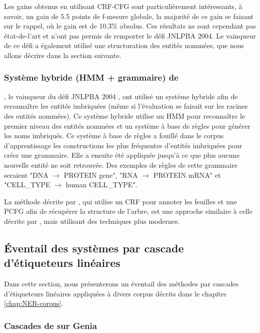 \documentclass[12pt,a4paper,times,twoside,openright]{report}
\begin{document}
Les gains obtenus en utilisant CRF-CFG sont particulièrement intéressants, à savoir, un gain de 5.5 points de f-mesure globale, la majorité de ce gain se faisant sur le rappel, où le gain est de 10.3\% absolus. Ces résultats ne sont cependant pas état-de-l'art et n'ont pas permis de remporter le défi JNLPBA 2004. Le vainqueur de ce défi a également utilisé une structuration des entités nommées, que nous allons décrire dans la section suivante.

            \subsubsection{Système hybride (HMM + grammaire) de \citet{guodong2004exploring}}

\citet{guodong2004exploring}, le vainqueur du défi JNLPBA 2004 \citep{kim2004introduction}, ont utilisé un système hybride afin de reconnaître les entités imbriquées (même si l'évaluation se faisait sur les racines des entités nommées). Ce système hybride utilise un HMM pour reconnaître le premier niveau des entités nommées et un système à base de règles pour générer les noms imbriqués. Ce système à base de règles a fouillé dans le corpus d'apprentissage les constructions les plus fréquentes d'entités imbriquées pour créer une grammaire. Elle a ensuite été appliquée jusqu'à ce que plus aucune nouvelle entité ne soit retrouvée. Des exemples de règles de cette grammaire seraient "DNA $\rightarrow$ PROTEIN gene", "RNA $\rightarrow$ PROTEIN mRNA" et "CELL\_TYPE $\rightarrow$ human CELL\_TYPE".

La méthode décrite par \citet{dinarelli2012}, qui utilise un CRF pour annoter les feuilles et une PCFG afin de récupérer la structure de l'arbre, est une approche similaire à celle décrite par \citet{guodong2004exploring}, mais utilisant des techniques plus modernes.


        \subsection{Éventail des systèmes par cascade d'étiqueteurs linéaires}

Dans cette section, nous présenterons un éventail des méthodes par cascades d'étiqueteurs linéaires appliquées à divers corpus décrits dans le chapitre \ref{chap:NER-corpus}.

            \subsubsection{Cascades de \citet{alex2007recognising} sur Genia}
            
\end{document}

